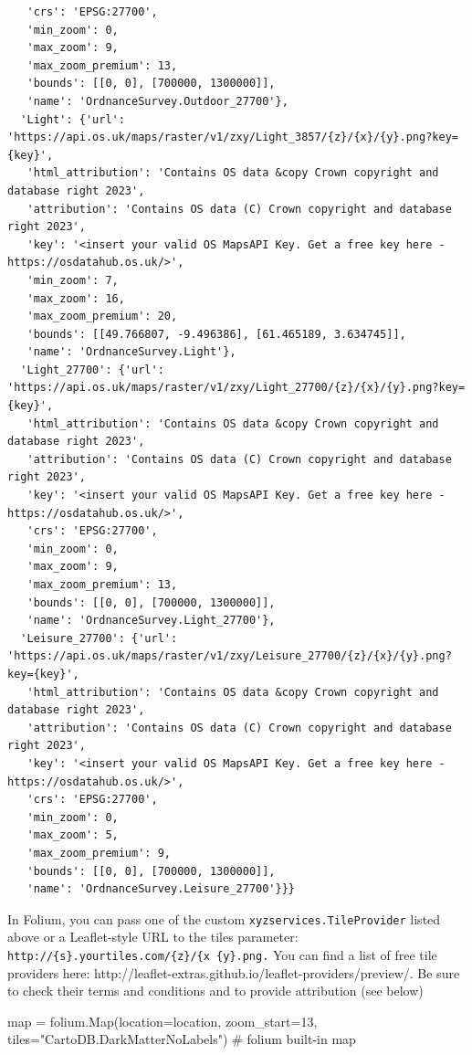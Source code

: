 \documentclass[
  letterpaper,
  DIV=11,
  numbers=noendperiod]{scrreprt}
\newenvironment{Shaded}{\begin{snugshade}}{\end{snugshade}}
\newcommand{\BuiltInTok}[1]{\textcolor[rgb]{0.00,0.23,0.31}{#1}}
\newcommand{\CommentTok}[1]{\textcolor[rgb]{0.37,0.37,0.37}{#1}}
\newcommand{\DecValTok}[1]{\textcolor[rgb]{0.68,0.00,0.00}{#1}}
\newcommand{\NormalTok}[1]{\textcolor[rgb]{0.00,0.23,0.31}{#1}}
\newcommand{\OperatorTok}[1]{\textcolor[rgb]{0.37,0.37,0.37}{#1}}
\newcommand{\StringTok}[1]{\textcolor[rgb]{0.13,0.47,0.30}{#1}}
\begin{document}
\begin{verbatim}
   'crs': 'EPSG:27700',
   'min_zoom': 0,
   'max_zoom': 9,
   'max_zoom_premium': 13,
   'bounds': [[0, 0], [700000, 1300000]],
   'name': 'OrdnanceSurvey.Outdoor_27700'},
  'Light': {'url': 'https://api.os.uk/maps/raster/v1/zxy/Light_3857/{z}/{x}/{y}.png?key={key}',
   'html_attribution': 'Contains OS data &copy Crown copyright and database right 2023',
   'attribution': 'Contains OS data (C) Crown copyright and database right 2023',
   'key': '<insert your valid OS MapsAPI Key. Get a free key here - https://osdatahub.os.uk/>',
   'min_zoom': 7,
   'max_zoom': 16,
   'max_zoom_premium': 20,
   'bounds': [[49.766807, -9.496386], [61.465189, 3.634745]],
   'name': 'OrdnanceSurvey.Light'},
  'Light_27700': {'url': 'https://api.os.uk/maps/raster/v1/zxy/Light_27700/{z}/{x}/{y}.png?key={key}',
   'html_attribution': 'Contains OS data &copy Crown copyright and database right 2023',
   'attribution': 'Contains OS data (C) Crown copyright and database right 2023',
   'key': '<insert your valid OS MapsAPI Key. Get a free key here - https://osdatahub.os.uk/>',
   'crs': 'EPSG:27700',
   'min_zoom': 0,
   'max_zoom': 9,
   'max_zoom_premium': 13,
   'bounds': [[0, 0], [700000, 1300000]],
   'name': 'OrdnanceSurvey.Light_27700'},
  'Leisure_27700': {'url': 'https://api.os.uk/maps/raster/v1/zxy/Leisure_27700/{z}/{x}/{y}.png?key={key}',
   'html_attribution': 'Contains OS data &copy Crown copyright and database right 2023',
   'attribution': 'Contains OS data (C) Crown copyright and database right 2023',
   'key': '<insert your valid OS MapsAPI Key. Get a free key here - https://osdatahub.os.uk/>',
   'crs': 'EPSG:27700',
   'min_zoom': 0,
   'max_zoom': 5,
   'max_zoom_premium': 9,
   'bounds': [[0, 0], [700000, 1300000]],
   'name': 'OrdnanceSurvey.Leisure_27700'}}}
\end{verbatim}

In Folium, you can pass one of the custom
\texttt{xyzservices.TileProvider} listed above or a Leaflet-style URL to
the tiles parameter:
\texttt{http://\{s\}.yourtiles.com/\{z\}/\{x\ \{y\}.png.} You can find a
list of free tile providers here:
http://leaflet-extras.github.io/leaflet-providers/preview/. Be sure to
check their terms and conditions and to provide attribution (see below)

\begin{Shaded}
\begin{Highlighting}[]
\BuiltInTok{map} \OperatorTok{=}\NormalTok{ folium.Map(location}\OperatorTok{=}\NormalTok{location, zoom\_start}\OperatorTok{=}\DecValTok{13}\NormalTok{, tiles}\OperatorTok{=}\StringTok{"CartoDB.DarkMatterNoLabels"}\NormalTok{) }\CommentTok{\# folium built{-}in}
\BuiltInTok{map}
\end{Highlighting}
\end{Shaded}
\end{document}
